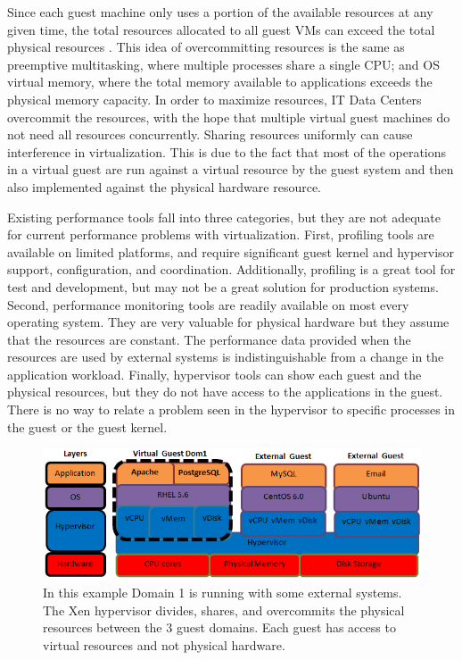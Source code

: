 Since each guest machine only uses a portion of the available resources at any given time, the total resources allocated to all guest VMs can exceed the total physical resources \cite{huber2, amit, buell1}.   This idea of overcommitting resources is the same as preemptive multitasking, where multiple processes share a single CPU; and OS virtual memory, where the total memory available to applications exceeds the physical memory capacity.  In order to maximize resources, IT Data Centers overcommit the resources, with the hope that multiple virtual guest machines do not need all resources concurrently.  
Sharing resources uniformly can cause interference in virtualization.  This is due to the fact that most of the operations in a virtual guest are run against a virtual resource by the guest system and then also implemented against the physical hardware resource.  

Existing performance tools fall into three categories, but they are not adequate for current performance problems with virtualization.
First, profiling tools are available on limited platforms, and require significant guest kernel and hypervisor support, configuration, and coordination.  Additionally, profiling is a great tool for test and development, but may not be a great solution for production systems.  
Second, performance monitoring tools are readily available on most every operating system.  They are very valuable for physical hardware but they assume that the resources are constant.  The performance data provided when the resources are used by external systems is indistinguishable from a change in the application workload.
Finally, hypervisor tools can show each guest and the physical resources, but they do not have access to the applications in the guest.  There is no way to relate a problem seen in the hypervisor to specific processes in the guest or the guest kernel. 

\begin{figure}[!h]
  \begin{center}
  \includegraphics[width=6in]{images/LayersAll.png}
  \caption{In this example Domain 1 is running with some external systems.  The Xen hypervisor  divides, shares, and overcommits the physical resources between the 3 guest domains.  Each guest has access to virtual resources and not physical hardware.}
  \label{virtStack}
  \end{center}
\end{figure}

